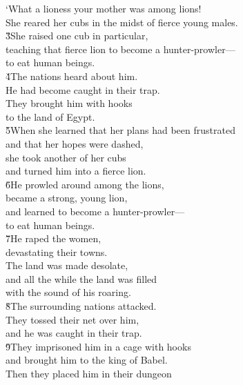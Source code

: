 \begin{poetry}
\poeml `What a lioness your mother was among lions! \\
\poemll    She reared her cubs in the midst of fierce young males. \\
\poeml \v{3}She raised one cub in particular, \\
\poemll    teaching that fierce lion to become a hunter-prowler--- \\
\poemlll       to eat human beings. \\
\poeml \v{4}The nations heard about him. \\
\poemll    He had become caught in their trap. \\
\poeml They brought him with hooks \\
\poemll    to the land of Egypt. \\
\poeml \v{5}When she learned that her plans had been frustrated \\
\poemll    and that her hopes were dashed, \\
\poeml she took another of her cubs \\
\poemll    and turned him into a fierce lion. \\
\poeml \v{6}He prowled around among the lions, \\
\poemll    became a strong, young lion, \\
\poeml and learned to become a hunter-prowler--- \\
\poemll    to eat human beings. \\
\poeml \v{7}He raped the women, \\
\poemll    devastating their towns. \\
\poeml The land was made desolate, \\
\poemll    and all the while the land was filled \\
\poemlll       with the sound of his roaring. \\
\poeml \v{8}The surrounding nations attacked. \\
\poemll    They tossed their net over him, \\
\poemlll       and he was caught in their trap. \\
\poeml \v{9}They imprisoned him in a cage with hooks \\
\poemll    and brought him to the king of Babel. \\
\poeml Then they placed him in their dungeon \\

\end{poetry}

